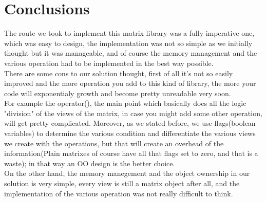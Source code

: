 \documentclass[12pt]{article}%
\begin{document}
\section{Conclusions}
The route we took to implement this matrix library was a fully imperative one, which was easy to design, the implementation was not so simple as we initially thought but it was manageable, and of course the memory management and the various operation had to be implemented in the best way possible.\\
There are some cons to our solution thought, first of all it's not so easily improved and the more operation you add to this kind of library, the more your code will exponentialy growth and become pretty unreadable very soon.\\
For example the operator(), the main point which basically does all the logic "division" of the views of the matrix, in case you might add some other operation, will get pretty complicated.
Moreover, as we stated before, we use flags(boolean variables) to determine the various condition and differentiate the various views we create with the operations, but that will create an overhead of the information(Plain matrixes of course have all that flags set to zero, and that is a waste); in that way an OO design is the better choice.\\
On the other hand, the memory manegement and the object ownership in our solution is very simple, every view is still a matrix object after all, and the implementation of the various operation was not really difficult to think.


       
                       
                       
  
  
  
  
  
  
  
  
  
  
\end{document}
